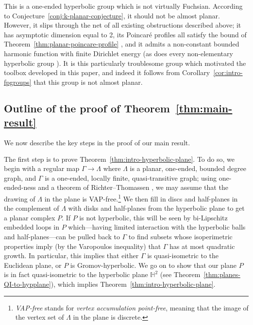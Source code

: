 \documentclass[11pt,a4paper]{amsart}
\newcommand{\bbH}{\mathbb{H}}
\theoremstyle{definition}
\begin{document}
This is a one-ended hyperbolic group which is not virtually Fuchsian. According to Conjecture~\ref{conj:k-planar-conjecture}, it should not be almost planar. However, it slips through the net of all existing obstructions described above; it has asymptotic dimension equal to 2, its Poincar\'e profiles all satisfy the bound of Theorem~\ref{thm:planar-poincare-profile} \cite[Thm.~1.17]{hume-mackay-25-round-trees}, and it admits a non-constant bounded harmonic function with finite Dirichlet energy (as does every non-elementary hyperbolic group \cite{ancona2007positive}). 
It is this particularly troublesome group which motivated the toolbox developed in this paper, and indeed it follows from Corollary~\ref{cor:intro-fpgroups} that this group is not almost planar. 






\subsection{Outline of the proof of Theorem~\ref{thm:main-result}}\label{sec:outline}

We now describe the key steps in the proof of our main result. 

The first step is to prove Theorem~\ref{thm:intro-hyperbolic-plane}. To do so, we begin with a regular map $\Gamma\to \Lambda$ where $\Lambda$ is a planar, one-ended, bounded degree graph, and $\Gamma$ is a one-ended, locally finite, quasi-transitive graph; using one-ended-ness and a theorem of Richter--Thomassen \cite{richter20023}, we may assume that the drawing of $\Lambda$ in the plane is VAP-free.\footnote{\emph{VAP-free} stands for \emph{vertex accumulation point-free}, meaning that the image of the vertex set of $\Lambda$ in the plane is discrete.}  We then fill in discs and half-planes in the complement of $\Lambda$ with disks and half-planes from the hyperbolic plane to get a planar complex $P$.  If $P$ is not hyperbolic, this will be seen by bi-Lipschitz embedded loops in $P$ which---having limited interaction with the hyperbolic balls and half-planes---can be pulled back to $\Gamma$ to find subsets whose isoperimetric properties imply (by the Varopoulos inequality) that $\Gamma$ has at most quadratic growth. In particular, this implies that either $\Gamma$ is quasi-isometric to the Euclidean plane, or $P$ is Gromov-hyperbolic. We go on to show that our plane $P$ is in fact quasi-isometric to the hyperbolic plane $\bbH^2$ (see Theorem~\ref{thm:planes-QI-to-hypplane}), which implies Theorem~\ref{thm:intro-hyperbolic-plane}. 
\end{document}
